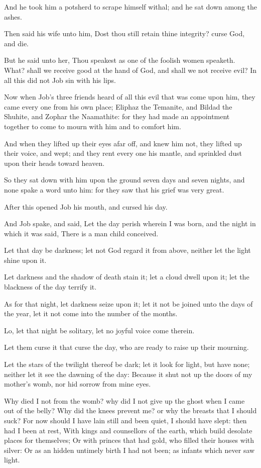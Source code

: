 \Verse And he took him a potsherd to scrape himself withal; and he sat down among the ashes.

\Verse Then said his wife unto him, Dost thou still retain thine integrity?  curse God, and die.

\Verse But he said unto her, Thou speakest as one of the foolish women speaketh. What? shall we receive good at the hand of God, and shall we not receive evil? In all this did not Job sin with his lips.

\Verse Now when Job's three friends heard of all this evil that was come upon him, they came every one from his own place; Eliphaz the Temanite, and Bildad the Shuhite, and Zophar the Naamathite: for they had made an appointment together to come to mourn with him and to comfort him.

\Verse And when they lifted up their eyes afar off, and knew him not, they lifted up their voice, and wept; and they rent every one his mantle, and sprinkled dust upon their heads toward heaven.

\Verse So they sat down with him upon the ground seven days and seven nights, and none spake a word unto him: for they saw that his grief was very great.


\Chapter
\Verse After this opened Job his mouth, and cursed his day.

\Verse And Job spake, and said, \Verse Let the day perish wherein I was born, and the night in which it was said, There is a man child conceived.

\Verse Let that day be darkness; let not God regard it from above, neither let the light shine upon it.

\Verse Let darkness and the shadow of death stain it; let a cloud dwell upon it; let the blackness of the day terrify it.

\Verse As for that night, let darkness seize upon it; let it not be joined unto the days of the year, let it not come into the number of the months.

\Verse Lo, let that night be solitary, let no joyful voice come therein.

\Verse Let them curse it that curse the day, who are ready to raise up their mourning.

\Verse Let the stars of the twilight thereof be dark; let it look for light, but have none; neither let it see the dawning of the day: \Verse Because it shut not up the doors of my mother's womb, nor hid sorrow from mine eyes.

\Verse Why died I not from the womb? why did I not give up the ghost when I came out of the belly?  \Verse Why did the knees prevent me? or why the breasts that I should suck?  \Verse For now should I have lain still and been quiet, I should have slept: then had I been at rest, \Verse With kings and counsellors of the earth, which build desolate places for themselves; \Verse Or with princes that had gold, who filled their houses with silver: \Verse Or as an hidden untimely birth I had not been; as infants which never saw light.

